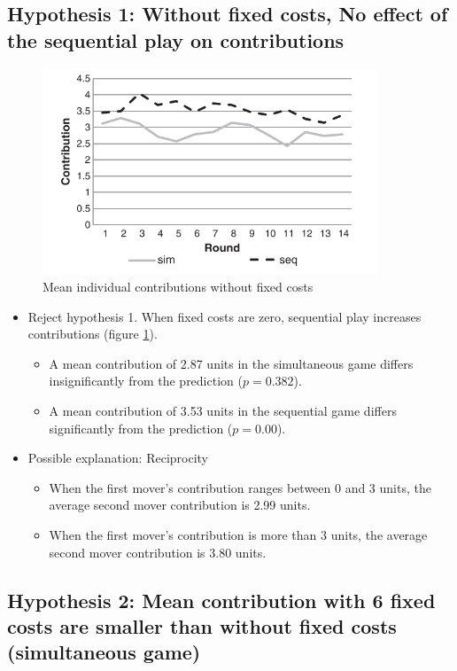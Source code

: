 \documentclass[../root]{subfiles}
\begin{document}
    \subsection{Hypothesis 1: Without fixed costs, No effect of the sequential play on contributions}  

    \begin{figure}[H]
        \centering
        \includegraphics[width = 10cm]{0605kato/h1.png}
        \caption{Mean individual contributions without fixed costs}
        \label{hypo1}
    \end{figure}

    \begin{itemize}
        \item Reject hypothesis 1. When fixed costs are zero, sequential play increases contributions (figure \ref{hypo1}).
        \begin{itemize}
            \item A mean contribution of 2.87 units in the simultaneous game differs insignificantly from the prediction ($p = 0.382$).
            \item A mean contribution of 3.53 units in the sequential game differs significantly from the prediction ($p = 0.00$).
        \end{itemize}
        \item Possible explanation: Reciprocity
        \begin{itemize}
            \item When the first mover's contribution ranges between 0 and 3 units, the average second mover contribution is 2.99 units.
            \item When the first mover's contribution is more than 3 units, the average second mover contribution is 3.80 units.
        \end{itemize}
    \end{itemize}


    \subsection{Hypothesis 2: Mean contribution with 6 fixed costs are smaller than without fixed costs (simultaneous game)}
\end{document}
